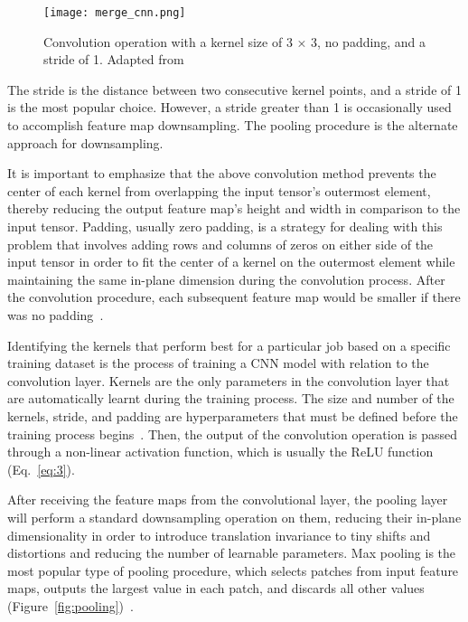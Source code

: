 \begin{figure}[htbp]
    \centering
    \texttt{[image: merge\_cnn.png]}
    \caption{Convolution operation with a kernel size of 3 × 3, no padding, and a stride of 1. Adapted from~\cite{Yamashita2018ConvolutionalRadiology}}
    \label{fig:merge_cnn}
\end{figure}

The stride is the distance between two consecutive kernel points, and a stride of 1 is the most popular choice. However, a stride greater than 1 is occasionally used to accomplish feature map downsampling. The pooling procedure is the alternate approach for downsampling.

It is important to emphasize that the above convolution method prevents the center of each kernel from overlapping the input tensor's outermost element, thereby reducing the output feature map's height and width in comparison to the input tensor. Padding, usually zero padding, is a strategy for dealing with this problem that involves adding rows and columns of zeros on either side of the input tensor in order to fit the center of a kernel on the outermost element while maintaining the same in-plane dimension during the convolution process. After the convolution procedure, each subsequent feature map would be smaller if there was no padding~\cite{Yamashita2018ConvolutionalRadiology}.

Identifying the kernels that perform best for a particular job based on a specific training dataset is the process of training a \gls{CNN} model with relation to the convolution layer. Kernels are the only parameters in the convolution layer that are automatically learnt during the training process. The size and number of the kernels, stride, and padding are hyperparameters that must be defined before the training process begins~\cite{Yamashita2018ConvolutionalRadiology}. Then, the output of the convolution operation is passed through a non-linear activation function, which is usually the ReLU function (Eq.~\ref{eq:3}). 

After receiving the feature maps from the convolutional layer, the pooling layer will perform a standard downsampling operation on them, reducing their in-plane dimensionality in order to introduce translation invariance to tiny shifts and distortions and reducing the number of learnable parameters. Max pooling is the most popular type of pooling procedure, which selects patches from input feature maps, outputs the largest value in each patch, and discards all other values (Figure~\ref{fig:pooling})~\cite{Yamashita2018ConvolutionalRadiology}.

